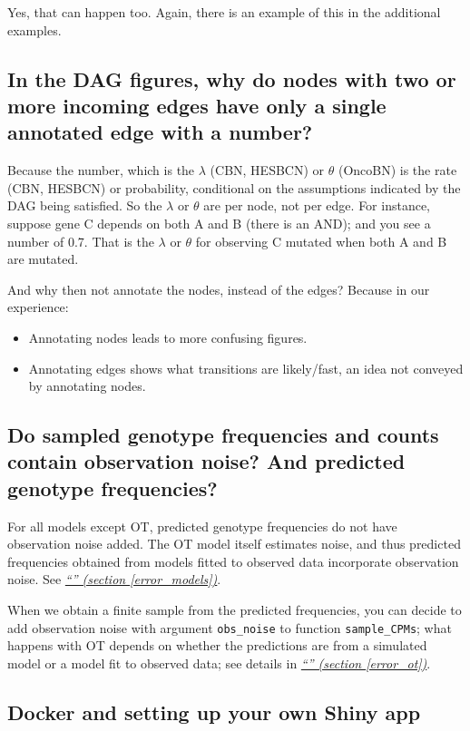 \documentclass[a4paper,11pt]{article}
\newcommand*{\qref}[1]{\hyperref[{#1}]{\textit{``\nameref*{#1}'' (section \ref*{#1})}}}
\begin{document}
Yes, that can happen too. Again, there is an example of this in the additional examples.


\subsection{In the DAG figures, why do nodes with two or more incoming edges have only a single annotated edge with a number?}
\label{faq-single-num}

Because the number, which is the $\lambda$ (CBN, HESBCN) or $\theta$ (OncoBN) is the rate (CBN, HESBCN) or probability, conditional on the assumptions indicated by the DAG being satisfied. So the $\lambda$ or $\theta$ are per node, not per edge. For instance, suppose gene C depends on both A and B (there is an AND); and you see a number of 0.7. That is the $\lambda$ or $\theta$ for observing C mutated when both A and B are mutated. 


And why then not annotate the nodes, instead of the edges? Because in our experience:
\begin{itemize}
\item Annotating nodes leads to more confusing figures.
\item Annotating edges shows what transitions are likely/fast, an idea not conveyed by annotating nodes.
\end{itemize}



\subsection{Do sampled genotype frequencies and counts contain observation noise? And predicted genotype frequencies?}
\label{sec:do-sampled-genotype}

For all models except OT, predicted genotype frequencies do not have observation noise added. The OT model itself estimates noise, and thus predicted frequencies obtained from models fitted to observed data incorporate observation noise. See \qref{error_models}.

When we obtain a finite sample from the predicted frequencies, you can decide to add observation noise with argument \texttt{obs\_noise} to function \texttt{sample\_CPMs}; what happens with OT depends on whether the predictions are from a simulated model or a model fit to observed data; see details in \qref{error_ot}.



\subsection{Docker and setting up your own Shiny app}
\end{document}
